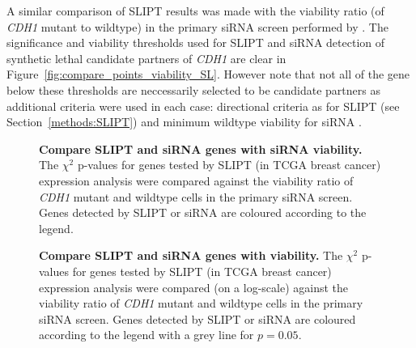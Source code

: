 A similar comparison of \gls{SLIPT} results was made with the viability ratio (of \textit{CDH1} mutant to wildtype) in the primary \gls{siRNA} screen performed by \citet{Telford2015}. The significance and viability thresholds used for \gls{SLIPT} and \gls{siRNA} detection of synthetic lethal candidate partners of \textit{CDH1} are clear in Figure~\ref{fig:compare_points_viability_SL}. However note that not all of the gene below these thresholds are neccessarily selected to be candidate partners as additional criteria were used in each case: directional criteria as for \gls{SLIPT} (see Section~\ref{methods:SLIPT}) and minimum wildtype viability for \gls{siRNA} \citep{Telford2015}.

\begin{figure}[!htp]
\begin{mdframed}
\begin{center}
   \end{center}
   \caption[Compare SLIPT and siRNA genes with siRNA viability]{\small \textbf{Compare \gls{SLIPT} and \gls{siRNA} genes with \gls{siRNA} viability.} The $\chi^2$ p-values for genes tested by \gls{SLIPT} (in TCGA breast cancer) expression analysis were compared against the viability ratio of \textit{CDH1} mutant and wildtype cells in the primary \gls{siRNA} screen. Genes detected by \gls{SLIPT} or \gls{siRNA} are coloured according to the legend. 
}
\label{fig:compare_points_viability_SL}
\end{mdframed}

\begin{mdframed}
\begin{center}
   \end{center}
   \caption[Compare SLIPT and siRNA genes with viability]{\small \textbf{Compare \gls{SLIPT} and \gls{siRNA} genes with viability.} The $\chi^2$ p-values for genes tested by \gls{SLIPT} (in TCGA breast cancer) expression analysis were compared (on a log-scale) against the viability ratio of \textit{CDH1} mutant and wildtype cells in the primary \gls{siRNA} screen. Genes detected by \gls{SLIPT} or \gls{siRNA} are coloured according to the legend with a grey line for $p=0.05$.
}
\label{fig:compare_pval_points_correlation_SL}
\end{mdframed}
\end{figure}

